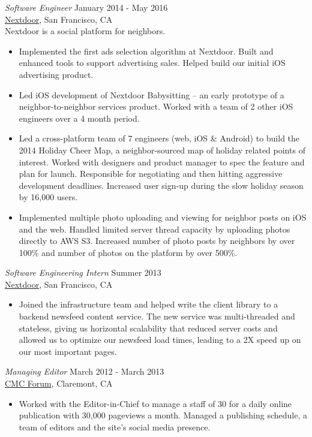 \documentclass[margin, 10pt]{res}
\begin{document}
\begin{resume}
\begin{flushleft}
{\sl Software Engineer} \hfill January 2014 - May 2016 \\
\href{http://www.nextdoor.com}{Nextdoor}, San Francisco, CA \\
Nextdoor is a social platform for neighbors.
\begin{itemize} \itemsep -1pt %
\item Implemented the first ads selection algorithm at Nextdoor. Built and enhanced tools to support advertising sales. Helped build our initial iOS advertising product.
\item Led iOS development of Nextdoor Babysitting -- an early prototype of a neighbor-to-neighbor services product. Worked with a team of 2 other iOS engineers over a 4 month period.
\item Led a cross-platform team of 7 engineers (web, iOS \& Android) to build the 2014 Holiday Cheer Map, a neighbor-sourced map of holiday related points of interest. Worked with designers and product manager to spec the feature and plan for launch. Responsible for negotiating and then hitting aggressive development deadlines. Increased user sign-up during the slow holiday season by 16,000 users.
\item Implemented multiple photo uploading and viewing for neighbor posts on iOS and the web. Handled limited server thread capacity by uploading photos directly to AWS S3. Increased number of photo posts by neighbors by over 100\% and number of photos on the platform by over 500\%.
\end{itemize}

{\sl Software Engineering Intern} \hfill Summer 2013 \\
\href{http://www.nextdoor.com}{Nextdoor}, San Francisco, CA
\begin{itemize}
\item Joined the infrastructure team and helped write the client library to a backend newsfeed content service. The new service was multi-threaded and stateless, giving us horizontal scalability that reduced server costs and allowed us to optimize our newsfeed load times, leading to a 2X speed up on our most important pages.
\end{itemize}

{\sl Managing Editor} \hfill March 2012 - March 2013 \\
\href{http://cmcforum.com/}{CMC Forum}, Claremont, CA
\begin{itemize}
\item Worked with the Editor-in-Chief to manage a staff of 30 for a daily online publication with 30,000 pageviews a month. Managed a publishing schedule, a team of editors and the site's social media presence.
\end{itemize}


\end{flushleft}
\end{resume}
\end{document}
